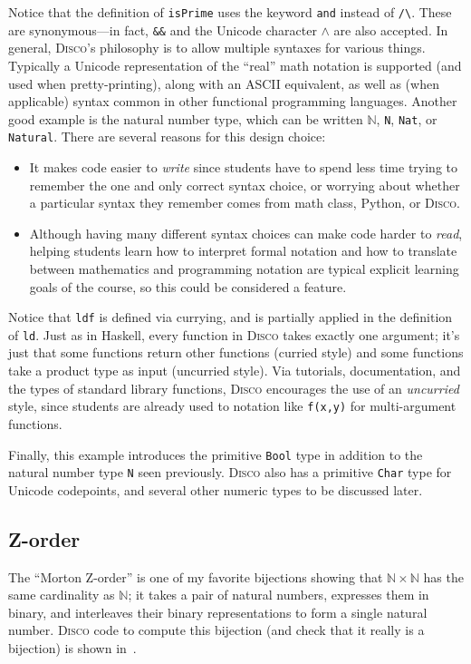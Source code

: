 \documentclass[submission,copyright,creativecommons]{eptcs}
\newcommand{\disco}{\textsc{Disco}\xspace}
\newcommand{\pref}[1]{\prettyref{#1}}
\newcommand{\N}{\mathbb{N}}
\begin{document}
Notice that the definition of \verb|isPrime| uses the keyword
\verb|and| instead of \verb|/\|.  These are synonymous---in fact,
\verb|&&| and the Unicode character $\land$ are also accepted.  In
general, \disco's philosophy is to allow multiple syntaxes for various
things.  Typically a Unicode representation of the ``real'' math
notation is supported (and used when pretty-printing), along with an
ASCII equivalent, as well as (when applicable) syntax common in other
functional programming languages.  Another good example is the natural
number type, which can be written $\N$, \verb|N|, \verb|Nat|, or
\verb|Natural|.  There are several reasons for this design choice:
\begin{itemize}
\item It makes code easier to \emph{write} since students have to
  spend less time trying to remember the one and only correct syntax
  choice, or worrying about whether a particular syntax they remember
  comes from math class, Python, or \disco.
\item Although having many different syntax choices can make code
  harder to \emph{read}, helping students learn how to interpret
  formal notation and how to translate between mathematics and
  programming notation are typical explicit learning goals of the
  course, so this could be considered a feature.
\end{itemize}

Notice that \verb|ldf| is defined via currying, and is partially
applied in the definition of \verb|ld|. Just as in Haskell, every
function in \disco takes exactly one argument; it's just that some
functions return other functions (curried style) and some functions
take a product type as input (uncurried style).  Via tutorials,
documentation, and the types of standard library functions, \disco
encourages the use of an \emph{uncurried} style, since students are
already used to notation like \verb|f(x,y)| for multi-argument
functions.

Finally, this example introduces the primitive \verb|Bool| type in
addition to the natural number type \verb|N| seen previously.  \disco
also has a primitive \verb|Char| type for Unicode codepoints, and
several other numeric types to be discussed later.

\subsection{Z-order}
\label{sec:zorder}

The ``Morton Z-order'' is one of my favorite bijections showing that
$\N \times \N$ has the same cardinality as $\N$; it takes a pair of
natural numbers, expresses them in binary, and interleaves their
binary representations to form a single natural number.  \disco code
to compute this bijection (and check that it really is a bijection) is
shown in~\pref{lst:zorder}.
\end{document}
